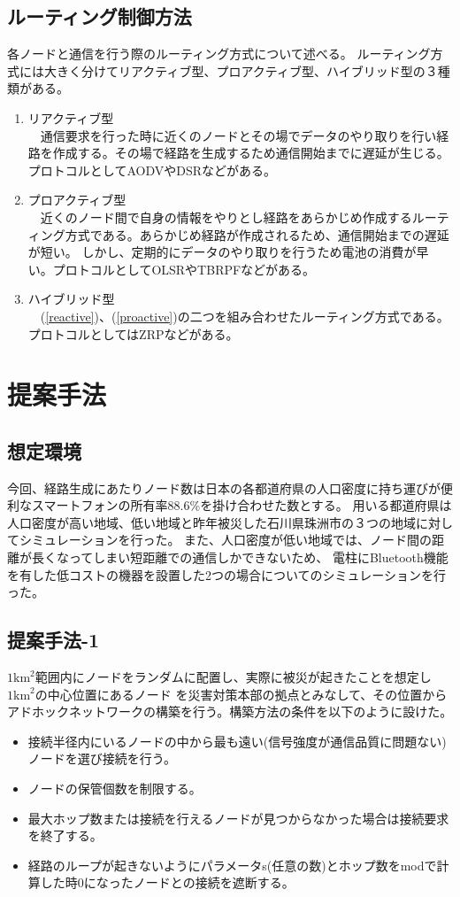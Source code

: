 \documentclass[a4paper, 10pt]{ltjsarticle}
\begin{document}
\subsection{ルーティング制御方法}
各ノードと通信を行う際のルーティング方式について述べる。
ルーティング方式には大きく分けてリアクティブ型、プロアクティブ型、ハイブリッド型の３種類がある。
\begin{enumerate}
  \item \label{reactive} リアクティブ型\\　通信要求を行った時に近くのノードとその場でデータのやり取りを行い経路を作成する。その場で経路を生成するため通信開始までに遅延が生じる。プロトコルとしてAODVやDSRなどがある。
  \item \label{proactive} プロアクティブ型\\　近くのノード間で自身の情報をやりとし経路をあらかじめ作成するルーティング方式である。あらかじめ経路が作成されるため、通信開始までの遅延が短い。
  しかし、定期的にデータのやり取りを行うため電池の消費が早い。プロトコルとしてOLSRやTBRPFなどがある。
  \item ハイブリッド型\\　(\ref{reactive})、(\ref{proactive})の二つを組み合わせたルーティング方式である。プロトコルとしてはZRPなどがある。
\end{enumerate}

\clearpage
\section{提案手法}
\subsection{想定環境}
今回、経路生成にあたりノード数は日本の各都道府県の人口密度に持ち運びが便利なスマートフォンの所有率88.6\%\cite{スマホ保有率}を掛け合わせた数とする。%
用いる都道府県は人口密度が高い地域、低い地域と昨年被災した石川県珠洲市の３つの地域に対してシミュレーションを行った。
また、人口密度が低い地域では、ノード間の距離が長くなってしまい短距離での通信しかできないため、
電柱にBluetooth機能を有した低コストの機器を設置した2つの場合についてのシミュレーションを行った。
\subsection{提案手法-1}
$1\mathrm{km}^2$範囲内にノードをランダムに配置し、実際に被災が起きたことを想定し$1\mathrm{km}^2$の中心位置にあるノード
を災害対策本部の拠点とみなして、その位置からアドホックネットワークの構築を行う。構築方法の条件を以下のように設けた。
\begin{itemize}
  \item 接続半径内にいるノードの中から最も遠い(信号強度が通信品質に問題ない)ノードを選び接続を行う。
  \item ノードの保管個数を制限する。
  \item 最大ホップ数または接続を行えるノードが見つからなかった場合は接続要求を終了する。
  \item 経路のループが起きないようにパラメータs(任意の数)とホップ数をmodで計算した時0になったノードとの接続を遮断する。
\end{itemize}
\end{document}
